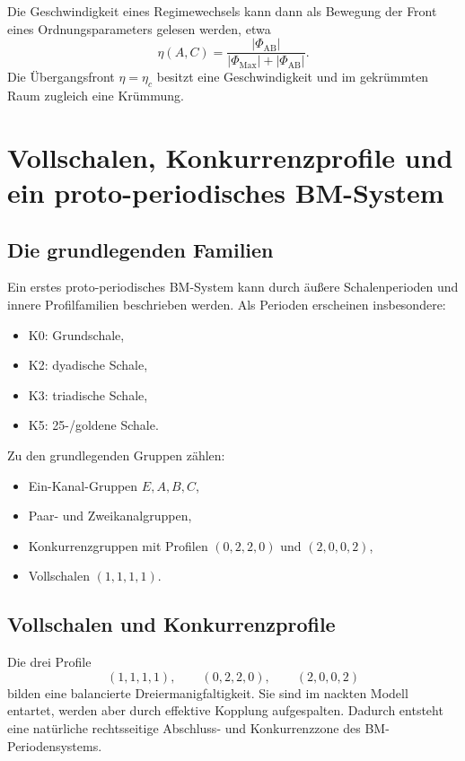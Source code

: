 \documentclass[11pt,a4paper]{article}
\theoremstyle{definition}
\theoremstyle{plain}
\begin{document}
	Die Geschwindigkeit eines Regimewechsels kann dann als Bewegung der Front eines Ordnungsparameters gelesen werden, etwa
	\[
	\eta(A,C)=\frac{|\Phi_{\mathrm{AB}}|}{|\Phi_{\mathrm{Max}}|+|\Phi_{\mathrm{AB}}|}.
	\]
	Die Übergangsfront $\eta=\eta_c$ besitzt eine Geschwindigkeit und im gekrümmten Raum zugleich eine Krümmung.
	
	\section{Vollschalen, Konkurrenzprofile und ein proto-periodisches BM-System}
	
	\subsection{Die grundlegenden Familien}
	
	Ein erstes proto-periodisches BM-System kann durch äußere Schalenperioden und innere Profilfamilien beschrieben werden. Als Perioden erscheinen insbesondere:
	\begin{itemize}[leftmargin=2em]
		\item K0: Grundschale,
		\item K2: dyadische Schale,
		\item K3: triadische Schale,
		\item K5: 25-/goldene Schale.
	\end{itemize}
	
	Zu den grundlegenden Gruppen zählen:
	\begin{itemize}[leftmargin=2em]
		\item Ein-Kanal-Gruppen $E,A,B,C$,
		\item Paar- und Zweikanalgruppen,
		\item Konkurrenzgruppen mit Profilen $(0,2,2,0)$ und $(2,0,0,2)$,
		\item Vollschalen $(1,1,1,1)$.
	\end{itemize}
	
	\subsection{Vollschalen und Konkurrenzprofile}
	
	Die drei Profile
	\[
	(1,1,1,1),\qquad (0,2,2,0),\qquad (2,0,0,2)
	\]
	bilden eine balancierte Dreiermanigfaltigkeit. Sie sind im nackten Modell entartet, werden aber durch effektive Kopplung aufgespalten. Dadurch entsteht eine natürliche rechtsseitige Abschluss- und Konkurrenzzone des BM-Periodensystems.
	
\end{document}
